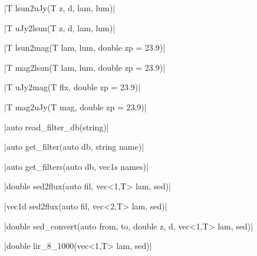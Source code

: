 \funcitem \cppinline|T lsun2uJy(T z, d, lam, lum)| 

\cppinline|T uJy2lsun(T z, d, lam, lum)| 

\funcitem \cppinline|T lsun2mag(T lam, lum, double zp = 23.9)| 

\cppinline|T mag2lsun(T lam, lum, double zp = 23.9)| 

\funcitem \cppinline|T uJy2mag(T flx, double zp = 23.9)| 

\cppinline|T mag2uJy(T mag, double zp = 23.9)| 

\funcitem \cppinline|auto read_filter_db(string)| 

\funcitem \cppinline|auto get_filter(auto db, string name)| 

\cppinline|auto get_filters(auto db, vec1s names)| 

\funcitem \cppinline|double sed2flux(auto fil, vec<1,T> lam, sed)| 

\cppinline|vec1d sed2flux(auto fil, vec<2,T> lam, sed)|

\funcitem \cppinline|double sed_convert(auto from, to, double z, d, vec<1,T> lam, sed)| 

\funcitem \cppinline|double lir_8_1000(vec<1,T> lam, sed)| 
